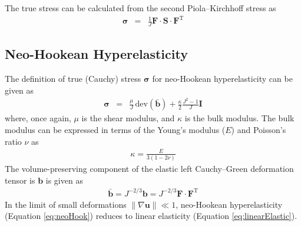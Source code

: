\documentclass[sn-mathphys,Numbered]{sn-jnl}%
\newcommand{\bb}{\boldsymbol}
\begin{document}
\begin{appendices}
The true stress can be calculated from the second Piola–Kirchhoff stress as
\begin{eqnarray} \label{eq:S2sigma}
	\bb{\sigma} &=& \frac{1}{J} \bb{F} \cdot \bb{S} \cdot \bb{F}^{\text{T}}
\end{eqnarray}
%
\subsection{Neo-Hookean Hyperelasticity}
%
The definition of true (Cauchy) stress $\bb{\sigma}$ for neo-Hookean hyperelasticity can be given as
\begin{eqnarray} \label{eq:neoHook}
	\bb{\sigma}
	&=& \frac{\mu}{J} \, \text{dev} \left( \bar{\bb{b}} \right) + \frac{\kappa}{2} \frac{J^2 - 1}{J} \textbf{I}
\end{eqnarray}
where, once again, $\mu$ is the shear modulus, and $\kappa$ is the bulk modulus.
The bulk modulus can be expressed in terms of the Young's modulus ($E$) and Poisson's ratio $\nu$ as
\begin{eqnarray}
	\kappa = \frac{E}{3(1 - 2\nu)}
\end{eqnarray}
The volume-preserving component of the elastic left Cauchy--Green deformation tensor is $\boldsymbol{b}$ is given as
\begin{eqnarray}
	\bar{\bb{b}} = J^{-2/3} \bb{b} = J^{-2/3} \bb{F} \cdot \bb{F}^{\text{T}}
\end{eqnarray}
In the limit of small deformations $\lVert \nabla \mathbf{u} \rVert  \ll 1$, neo-Hookean hyperelasticity (Equation \ref{eq:neoHook}) reduces to linear elasticity (Equation \ref{eq:linearElastic}).
%

\end{appendices}
\end{document}
